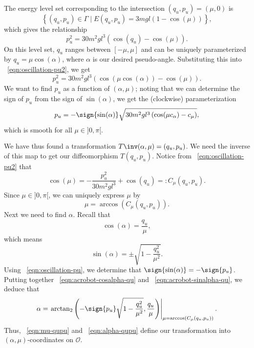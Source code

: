 The energy level set corresponding to the intersection \((q_u,p_u) = (\mu,0)\)
is 
\[
    \left\{(q_u,p_u) \in \Gamma \mid E(q_u,p_u) = 3mgl(1- \cos(\mu))\right\}
    ,
\]
which gives the relationship
\begin{equation}\label{eqn:oscillation-pu2}
    p_u^2 = 30m^2gl^3\left(\cos(q_u) - \cos(\mu)\right)
    .
\end{equation}
On this level set, \(q_u\) ranges between \([-\mu,\mu]\) and can be uniquely
parameterized by \(q_u = \mu \cos(\alpha)\), where \(\alpha\) is our
desired pseudo-angle.
Substituting this into ~\eqref{eqn:oscillation-pu2}, we get
\[
    p_u^2 = 30m^2gl^3\left(\cos(\mu \cos(\alpha)) - \cos(\mu)\right)
    .
\]
We want to find \(p_u\) as a function of \((\alpha,\mu)\); noting that we can
determine the sign of \(p_u\) from the sign of \(\sin(\alpha)\), we get the
(clockwise) parameterization
\begin{equation}\label{eqn:oscillation-pu}
    p_u = -\sign{\sin(\alpha)} \sqrt{30m^2gl^3 \left(\cos(\mu c_\alpha) - c_\mu\right)}
    ,
\end{equation}
which is smooth for all \(\mu \in ]0,\pi[\).

We have thus found a transformation \(T\inv(\alpha,\mu) = (q_u,p_u)\).
We need the inverse of this map to get our diffeomorphism \(T(q_u,p_u)\).
Notice from ~\eqref{eqn:oscillation-pu2} that
\[
    \cos(\mu) = -\frac{p_u^2}{30m^2gl^3} + \cos(q_u) =: C_\mu(q_u,p_u)
    .
\]
Since \(\mu \in ]0,\pi[\), we can uniquely express \(\mu\) by
\begin{equation}\label{eqn:mu-qupu}
    \mu = \arccos\left(C_\mu(q_u,p_u)\right)
    .
\end{equation}
Next we need to find \(\alpha\). 
Recall that 
\begin{equation}\label{eqn:acrobot-cosalpha-qu}
    \cos(\alpha) = \frac{q_u}{\mu}
    ,
\end{equation}
which means 
\begin{equation}\label{eqn:acrobot-sinalpha-qu}
    \sin(\alpha) = \pm \sqrt{1 - \frac{q_u^2}{\mu^2}}
    .
\end{equation}
Using ~\eqref{eqn:oscillation-pu}, we determine that
\(\sign{\sin(\alpha)} = -\sign{p_u}\).
Putting together ~\eqref{eqn:acrobot-cosalpha-qu} and
~\eqref{eqn:acrobot-sinalpha-qu}, we deduce that
\begin{equation}\label{eqn:alpha-qupu}
    \alpha = \left.
        \arctan_2\left( -\sign{p_u}\sqrt{1 - \frac{q_u^2}{\mu^2}}, \frac{q_u}{\mu}\right)
        \right|_{\mu = \arccos(C_\mu(q_u,p_u))}
    .
\end{equation}
Thus, ~\eqref{eqn:mu-qupu} and ~\eqref{eqn:alpha-qupu} define 
our transformation into \((\alpha,\mu)\)-coordinates on \(\mathcal{O}\).


